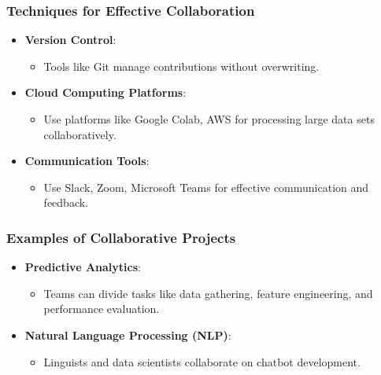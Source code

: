 \documentclass[aspectratio=169]{beamer}
\begin{document}
\begin{frame}
    \frametitle{Techniques for Effective Collaboration}
    \begin{itemize}
        \item \textbf{Version Control}:
            \begin{itemize}
                \item Tools like Git manage contributions without overwriting.
            \end{itemize}
        
        \item \textbf{Cloud Computing Platforms}:
            \begin{itemize}
                \item Use platforms like Google Colab, AWS for processing large data sets collaboratively.
            \end{itemize}
        
        \item \textbf{Communication Tools}:
            \begin{itemize}
                \item Use Slack, Zoom, Microsoft Teams for effective communication and feedback.
            \end{itemize}
    \end{itemize}
\end{frame}

\begin{frame}
    \frametitle{Examples of Collaborative Projects}
    \begin{itemize}
        \item \textbf{Predictive Analytics}:
            \begin{itemize}
                \item Teams can divide tasks like data gathering, feature engineering, and performance evaluation.
            \end{itemize}
        
        \item \textbf{Natural Language Processing (NLP)}:
            \begin{itemize}
                \item Linguists and data scientists collaborate on chatbot development.
            \end{itemize}
    \end{itemize}
\end{frame}
\end{document}
